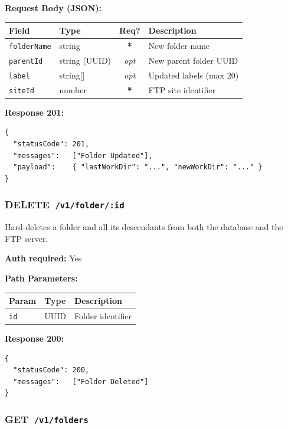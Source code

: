 \documentclass[12pt,a4paper]{article}
\newcommand{\httpget}[1]{%
  \colorbox{getcolor!20}{\textcolor{getcolor}{\textbf{\small GET}}}~\texttt{#1}%
}
\newcommand{\httpdelete}[1]{%
  \colorbox{deletecolor!20}{\textcolor{deletecolor}{\textbf{\small DELETE}}}~\texttt{#1}%
}
\newcommand{\required}{\textcolor{danger}{\textbf{*}}}
\newcommand{\optional}{\textcolor{muted}{\textit{opt}}}
\begin{document}
\textbf{Request Body (JSON):}

\begin{tabularx}{\linewidth}{llcX}
\toprule
\textbf{Field} & \textbf{Type} & \textbf{Req?} & \textbf{Description} \\
\midrule
\texttt{folderName} & string & \required & New folder name \\
\texttt{parentId}   & string (UUID) & \optional & New parent folder UUID \\
\texttt{label}      & string[] & \optional & Updated labels (max 20) \\
\texttt{siteId}     & number & \required & FTP site identifier \\
\bottomrule
\end{tabularx}

\textbf{Response 201:}
\begin{lstlisting}
{
  "statusCode": 201,
  "messages":   ["Folder Updated"],
  "payload":    { "lastWorkDir": "...", "newWorkDir": "..." }
}
\end{lstlisting}

\vspace{0.5em}
\subsubsection{\httpdelete{/v1/folder/:id}}

Hard-deletes a folder and all its descendants from both the database and the FTP server.

\textbf{Auth required:} Yes

\textbf{Path Parameters:}

\begin{tabularx}{\linewidth}{llX}
\toprule
\textbf{Param} & \textbf{Type} & \textbf{Description} \\
\midrule
\texttt{id} & UUID & Folder identifier \\
\bottomrule
\end{tabularx}

\textbf{Response 200:}
\begin{lstlisting}
{
  "statusCode": 200,
  "messages":   ["Folder Deleted"]
}
\end{lstlisting}

\vspace{0.5em}
\subsubsection{\httpget{/v1/folders}}
\end{document}
